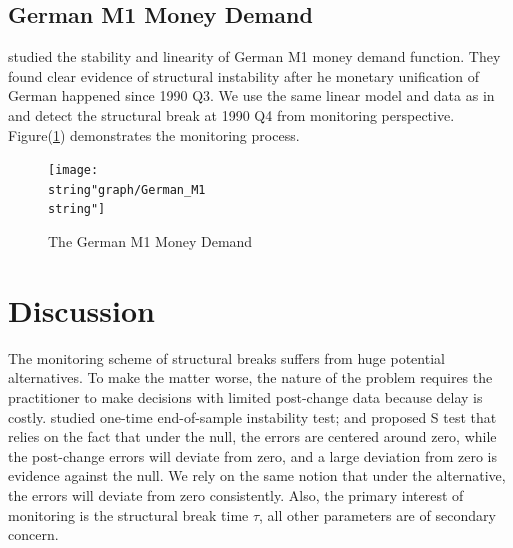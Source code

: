 \documentclass[preprint,authoryear,12pt,english]{elsarticle}
\theoremstyle{plain}
\begin{document}
\subsection{German M1 Money Demand}
\cite{Lutkepohl1999InvestigatingFunction} studied the stability and linearity of German M1 money demand function. They found clear evidence of structural instability after he monetary unification of German happened since 1990 Q3. We use the same linear model and data as in \cite{Zeileis2005} and detect the structural break at 1990 Q4 from monitoring perspective. Figure(\ref{fig:GermanM1}) demonstrates the monitoring process.
\noindent \begin{center}
    \begin{figure}[H]
        \centering
        \begin{minipage}[c]{1\textwidth}
            \centering
            \texttt{[image: \\string"graph/German\_M1\\string"]}
            \protect\caption{\label{fig:GermanM1}The German M1 Money Demand}
        \end{minipage}
    \end{figure}
    \par\end{center}
\section{Discussion}\label{sec:discussion}
The monitoring scheme of structural breaks suffers from huge potential alternatives. To make the matter worse, the nature of the problem requires the practitioner to make decisions with limited post-change data because delay is costly. \cite{Andrews2003End-of-sampleTests} studied one-time end-of-sample instability test; and proposed S test that relies on the fact that under the null, the errors are centered around zero, while the post-change errors will deviate from zero, and a large deviation from zero is evidence against the null. We rely on the same notion that under the alternative, the errors will deviate from zero consistently. Also, the primary interest of monitoring is the structural break time $\tau$, all other parameters are of secondary concern.
\end{document}
